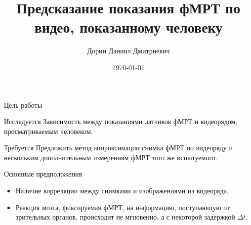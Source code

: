 \documentclass[9pt,pdf]{beamer} %
\title{Предсказание показания фМРТ по видео, показанному человеку}
\author{Дорин Даниил Дмитриевич}
\date{\today}
\institute[Московский физико-технический институт]{Московский физико-технический институт }
\begin{document}
	\begin{frame}{}
		\maketitle
	\end{frame}

\begin{frame}{Цель работы}
    \begin{block}{Исследуется}
    Зависимость между показаниями датчиков фМРТ и видеорядом, просматриваемым человеком.
    \end{block}
    
    \begin{block}{Требуется}
    Предложить метод аппроксимации снимка фМРТ по видеоряду и нескольким дополнительным измерениям фМРТ того же испытуемого.
    \end{block}
    \begin{block}{Основные предположения}
    \begin{itemize}
        \item Наличие корреляции между снимками и изображениями из видеоряда.
        \item Реакция мозга, фиксируемая фМРТ, на информацию, поступающую от зрительных органов, происходит не мгновенно, а с некоторой задержкой $\Delta t$.
    \end{itemize}
    \end{block}
\end{frame}
\end{document}
